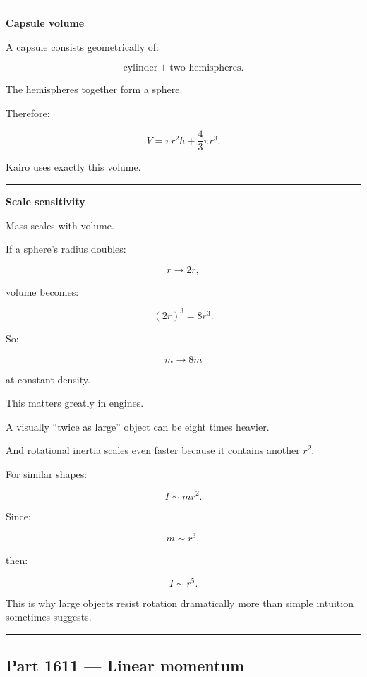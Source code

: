 \begin{center}\rule{0.5\linewidth}{0.5pt}\end{center}

\textbf{Capsule volume}

A capsule consists geometrically of:

\[
\text{cylinder}
+
\text{two hemispheres}.
\]

The hemispheres together form a sphere.

Therefore:

\[
V
=
\pi r^2h
+
\frac{4}{3}\pi r^3.
\]

Kairo uses exactly this volume.

\begin{center}\rule{0.5\linewidth}{0.5pt}\end{center}

\textbf{Scale sensitivity}

Mass scales with volume.

If a sphere's radius doubles:

\[
r\rightarrow2r,
\]

volume becomes:

\[
(2r)^3=8r^3.
\]

So:

\[
m\rightarrow8m
\]

at constant density.

This matters greatly in engines.

A visually ``twice as large'' object can be eight times heavier.

And rotational inertia scales even faster because it contains another \(r^2\).

For similar shapes:

\[
I\sim mr^2.
\]

Since:

\[
m\sim r^3,
\]

then:

\[
\boxed{
I\sim r^5.
}
\]

This is why large objects resist rotation dramatically more than simple intuition sometimes suggests.

\begin{center}\rule{0.5\linewidth}{0.5pt}\end{center}

\subsection{Part 1611 --- Linear momentum}\label{06-engine-ii-ch034-part-1611-linear-momentum}

